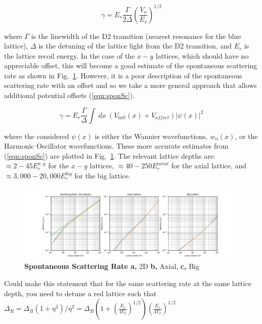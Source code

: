 \begin{equation}
\gamma=E_r \frac{\Gamma}{2 \Delta} \left ( \frac{V_o}{E_r}  \right )^{1/2}
\label{eqn:lambDickeEst}
\end{equation}

where $\Gamma$ is the linewidth of the D2 transition (nearest resonance for the blue lattice), $\Delta$ is the detuning of the lattice light from the D2 transition, and $E_r$ is the lattice recoil energy. In the case of the $x-y$ lattices, which should have no appreciable offset, this will become a good estimate of the spontaneous scattering rate as shown in Fig.~\ref{fig:heating}. However, it is a poor description of the spontaneous scattering rate with an offset and so we take a more general approach that allows additional potential offsets (\ref{eqn:sponSc}).

\begin{equation}
\gamma=E_r \frac{\Gamma}{\Delta} \int~dx~ \left ( V_{latt}(x) + V_{offset} \right ) |\psi(x)|^2
\label{eqn:sponSc}
\end{equation}

where the considered $\psi(x)$ is either the Wannier wavefunctions, $w_n(x)$, or the Harmonic Oscillator wavefunctions. These more accurate estimates from (\ref{eqn:sponSc}) are plotted in Fig.~\ref{fig:heating}. The relevant lattice depths are: $\approx 2-45E_r^{x,y}$ for the $x-y$ lattices, $\approx 40-250 E_r^{axial}$ for the axial lattice, and $\approx 3,000-20,000 E_r^{big}$ for the big lattice.

\begin{figure}[ht!]
		\includegraphics[width=\columnwidth]{figures/ch2/heating_rates/ScatteringRates.pdf} 
		\caption{\textbf{Spontaneous Scattering Rate a,}  2D \textbf{b,} Axial, \textbf{c,} Big }
		\label{fig:heating}	
\end{figure}

Could make this statement that for the same scattering rate at the same lattice depth, you need to detune a red lattice such that $\Delta_R = \Delta_B (1+\eta^2)/\eta^2 = \Delta_B \left ( 1 + \left ( \frac{E_r}{4 V_o} \right )^{1/2}  \right ) \left ( \frac{E_r}{4 V_o} \right )^{1/2} $

